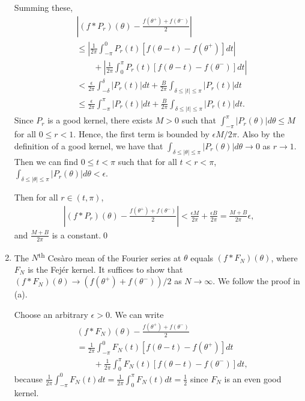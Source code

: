 \documentclass[oneside]{article}
\newcommand\abs[1]{\left|#1\right|}
\begin{document}
\begin{enumerate}[label=(\alph*)]
      Summing these,\begin{align*}
        &\abs{(f * P_r)(\theta) - \frac{f(\theta^+) + f(\theta^-)}{2}} \\
        &\leq \abs{\frac{1}{2\pi}\int_{-\pi}^0 P_r(t)\left[f(\theta-t) - f(\theta^+)\right]dt} \\
        &\qquad+ \abs{\frac{1}{2\pi}\int_0^\pi P_r(t)\left[f(\theta-t) - f(\theta^-)\right]dt} \\
        &< \frac{\epsilon}{2\pi} \int_{-\delta}^\delta \abs{P_r(t)} dt
        + \frac{B}{2\pi} \int_{\delta \leq \abs{t} \leq \pi} \abs{P_r(t)} dt \\
        &\leq \frac{\epsilon}{2\pi} \int_{-\pi}^\pi \abs{P_r(t)} dt
        + \frac{B}{2\pi} \int_{\delta \leq \abs{t} \leq \pi} \abs{P_r(t)} dt
        \text{.}
      \end{align*} Since $P_r$ is a good kernel, there exists $M > 0$ such that $\int_{-\pi}^\pi \abs{P_r(\theta)}d\theta \leq M$ for all $0 \leq r < 1$. Hence, the first term is bounded by $\epsilon M/2\pi$. Also by the definition of a good kernel, we have that $\int_{\delta \leq \abs{\theta} \leq \pi} \abs{P_r(\theta)} d\theta \to 0$ as $r \to 1$. Then we can find $0 \leq t < \pi$ such that for all $t < r < \pi$, $\int_{\delta \leq \abs{\theta} \leq \pi} \abs{P_r(\theta)} d\theta < \epsilon$.

      Then for all $r \in (t, \pi)$, \begin{align*}
        \abs{(f * P_r)(\theta) - \frac{f(\theta^+) + f(\theta^-)}{2}}
        < \frac{\epsilon M}{2\pi} + \frac{\epsilon B}{2\pi}
        = \frac{M + B}{2\pi}\epsilon \text{,}
      \end{align*} and $\frac{M + B}{2\pi}$ is a constant.\qed

    \item The $N$\textsuperscript{th} Cesàro mean of the Fourier series at $\theta$ equals $(f * F_N)(\theta)$, where $F_N$ is the Fejér kernel. It suffices to show that $(f * F_N)(\theta) \to (f(\theta^+) + f(\theta^-))/2$ as $N \to \infty$. We follow the proof in (a).

    Choose an arbitrary $\epsilon > 0$. We can write \begin{align*}
        &(f * F_N)(\theta) - \frac{f(\theta^+) + f(\theta^-)}{2} \\
        &= \frac{1}{2\pi}\int_{-\pi}^0 F_N(t)\left[f(\theta-t) - f(\theta^+)\right]dt\\
        &\qquad+ \frac{1}{2\pi}\int_0^\pi F_N(t)\left[f(\theta-t) - f(\theta^-)\right]dt\text{,}
    \end{align*} because $\frac{1}{2\pi}\int_{-\pi}^0 F_N(t)dt = \frac{1}{2\pi}\int_0^\pi F_N(t)dt = \frac{1}{2}$ since $F_N$ is an even good kernel.


\end{enumerate}
\end{document}
